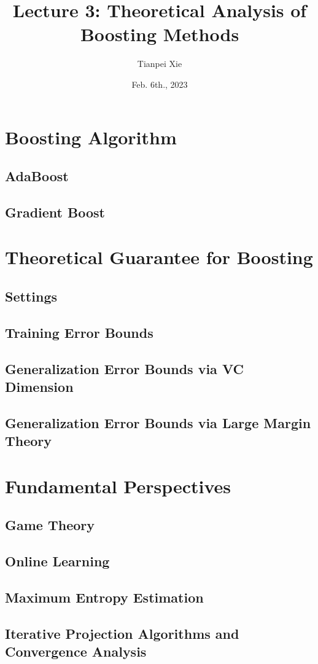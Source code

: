 \documentclass[11pt]{article}
\begin{document}
\title{Lecture 3:  Theoretical Analysis of Boosting Methods}
\author{ Tianpei Xie}
\date{Feb. 6th., 2023}
\maketitle
\tableofcontents
\newpage
\section{Boosting Algorithm}
\subsection{AdaBoost}
\subsection{Gradient Boost}

\section{Theoretical Guarantee for Boosting}
\subsection{Settings}
\subsection{Training Error Bounds}
\subsection{Generalization Error Bounds via VC Dimension}
\subsection{Generalization Error Bounds via Large Margin Theory}

\section{Fundamental Perspectives}
\subsection{Game Theory}
\subsection{Online Learning}
\subsection{Maximum Entropy Estimation}
\subsection{Iterative Projection Algorithms and Convergence Analysis}


\newpage


\end{document}
